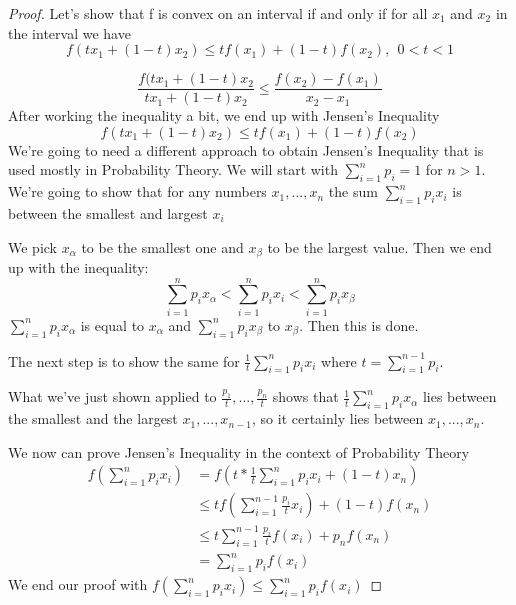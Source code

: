 \documentclass[11pt, a4paper, twocolumn]{article}
\theoremstyle{definition}
\begin{document}
	\begin{proof}
		Let's show that f is convex on an interval if and only if for all $x_1$ and $x_2$ in the interval we have
		$$f(tx_1 + (1-t)x_2) \leq tf(x_1) + (1-t)f(x_2), \ \  0 < t < 1$$
		
		$$\frac{f(tx_1 + (1-t)x_2}{tx_1 + (1-t)x_2} \leq \frac{f(x_2) - f(x_1)}{x_2 - x_1}$$
		After working the inequality a bit, we end up with Jensen's Inequality
		$$f(tx_1 + (1-t)x_2) \leq tf(x_1) + (1-t)f(x_2)$$
		We're going to need a different approach to obtain Jensen's Inequality that is used mostly in Probability Theory. We will start with $\sum_{i=1}^{n}p_i = 1 $ for $n > 1$. We're going to show that for any numbers $x_1,...,x_n$ the sum $\sum_{i=1}^{n}p_ix_i$ is between the smallest and largest $x_i$
		
		We pick $x_\alpha$ to be the smallest one and $x_\beta$ to be the largest value. Then we end up with the inequality:
		$$\sum_{i=1}^{n}p_ix_\alpha < \sum_{i=1}^{n}p_ix_i < \sum_{i=1}^{n}p_ix_\beta$$
		$\sum_{i=1}^{n}p_ix_\alpha$ is equal to $x_\alpha$ and $\sum_{i=1}^{n}p_ix_\beta$ to $x_\beta$. Then this is done.
		
		The next step is to show the same for $\frac{1}{t}\sum_{i=1}^{n}p_ix_i$ where $t = \sum_{i=1}^{n-1}p_i$.
		
		What we've just shown applied to $\frac{p_1}{t},...,\frac{p_n}{t}$ shows that $\frac{1}{t}\sum_{i=1}^{n}p_ix_\alpha$ lies between the smallest and the largest $x_1,...,x_{n-1}$, so it certainly lies between $x_1,...,x_n$.
	
		We now can prove Jensen's Inequality in the context of Probability Theory
		\begin{equation*}
		\begin{split}
			f(\sum_{i=1}^{n}p_ix_i) &= f(t* \frac{1}{t}\sum_{i=1}^{n}p_ix_i +(1-t)x_n) \\
			& \leq tf(\sum_{i=1}^{n-1}\frac{p_i}{t}x_i) + (1-t)f(x_n) \\
			& \leq t\sum_{i=1}^{n-1}\frac{p_i}{t}f(x_i) + p_nf(x_n) \\
			& = \sum_{i=1}^{n}p_if(x_i)
		\end{split}
		\end{equation*}
		We end our proof with $f(\sum_{i=1}^{n}p_ix_i) \leq \sum_{i=1}^{n}p_if(x_i)$
	\end{proof}
\end{document}
